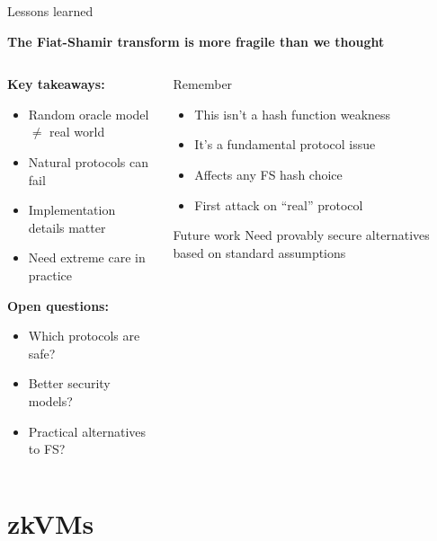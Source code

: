 \documentclass[aspectratio=169, lualatex, handout]{beamer}
\begin{document}
\begin{frame}{Lessons learned}
	\begin{center}
		\textbf{The Fiat-Shamir transform is more fragile than we thought}
	\end{center}
	\vspace{0.5em}
	\begin{columns}[c]
		\begin{column}{0.5\textwidth}
			\textbf{Key takeaways:}
			\begin{itemize}
				\item Random oracle model $\neq$ real world
				\item Natural protocols can fail
				\item Implementation details matter
				\item Need extreme care in practice
			\end{itemize}
			\vspace{0.5em}
			\textbf{Open questions:}
			\begin{itemize}
				\item Which protocols are safe?
				\item Better security models?
				\item Practical alternatives to FS?
			\end{itemize}
		\end{column}
		\begin{column}{0.5\textwidth}
			\begin{alertblock}{Remember}
				\begin{itemize}
					\item This isn't a hash function weakness
					\item It's a fundamental protocol issue
					\item Affects any FS hash choice
					\item First attack on ``real'' protocol
				\end{itemize}
			\end{alertblock}
			\vspace{0.5em}
			\begin{exampleblock}{Future work}
				Need provably secure alternatives based on standard assumptions
			\end{exampleblock}
		\end{column}
	\end{columns}
\end{frame}

\section{zkVMs}
\end{document}
